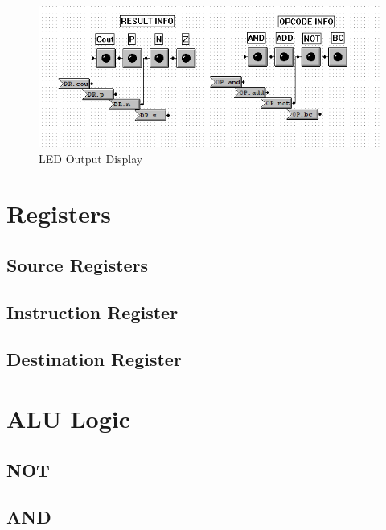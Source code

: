 \documentclass[a4paper,11pt]{article}
\begin{document}
      \begin{figure}
       \includegraphics[width=5in]{pictures/resultinfo}
     \caption{LED Output Display}
     \label{fig:resultinfo}
  \end{figure} 
\section{Registers}

\subsection{Source Registers}

\subsection{Instruction Register}

\subsection{Destination Register}

\section{ALU Logic}

\subsection{NOT}

\subsection{AND}
\end{document}
